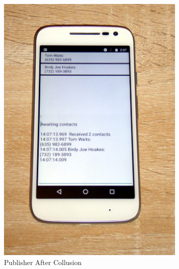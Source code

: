 \begin{figure}
\begin{subfigure}{0.49\textwidth}
		\includegraphics[height=0.45\textheight]{graphics/PhonePhotos/08 - PublisherAfter.jpg}
		\caption{Publisher After Collusion}
		\label{fig:PublisherAfter}
	\end{subfigure}
\\
	\begin{subfigure}{0.3\textheight}
		\centering

\end{subfigure}
\end{figure}
